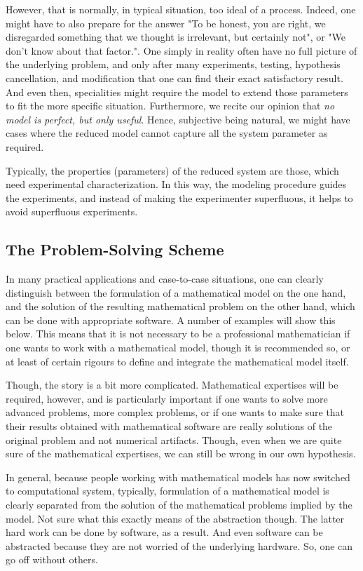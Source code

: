 However, that is normally, in typical situation, too ideal of a process. Indeed, one might have to also prepare for the answer "To be honest, you are right, we disregarded something that we thought is irrelevant, but certainly not", or "We don't know about that factor.". One simply in reality often have no full picture of the underlying problem, and only after many experiments, testing, hypothesis cancellation, and modification that one can find their exact satisfactory result. And even then, specialities might require the model to extend those parameters to fit the more specific situation. Furthermore, we recite our opinion that \textit{no model is perfect, but only useful}. Hence, subjective being natural, we might have cases where the reduced model cannot capture all the system parameter as required. 

\begin{remark}
    Typically, the properties (parameters) of the reduced system are those, which need experimental characterization. In this way, the modeling procedure guides the experiments, and instead of making the experimenter superfluous, it helps to avoid superfluous experiments. 
\end{remark}
\subsection{The Problem-Solving Scheme}
In many practical applications and case-to-case situations, one can clearly distinguish between the formulation of a mathematical model on the one hand, and the solution of the resulting mathematical problem on the other hand, which can be done with appropriate software. A number of examples will show this below. This means that it is not necessary to be a professional mathematician if one wants to work with a mathematical model, though it is recommended so, or at least of certain rigours to define and integrate the mathematical model itself. 

Though, the story is a bit more complicated. Mathematical expertises will be required, however, and is particularly important if one wants to solve more advanced problems, more complex problems, or if one wants to make sure that their results obtained with mathematical software are really solutions of the original problem and not numerical artifacts. Though, even when we are quite sure of the mathematical expertises, we can still be wrong in our own hypothesis. 

\begin{note}
    In general, because people working with mathematical models has now switched to computational system, typically, formulation of a mathematical model is clearly separated from the solution of the mathematical problems implied by the model. Not sure what this exactly means of the abstraction though. The latter hard work can be done by software, as a result. And even software can be abstracted because they are not worried of the underlying hardware. So, one can go off without others. 
\end{note}

